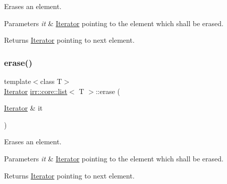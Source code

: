 Erases an element. 


\begin{DoxyParams}{Parameters}
{\em it} & \hyperlink{classirr_1_1core_1_1list_1_1Iterator}{Iterator} pointing to the element which shall be erased. \\
\hline
\end{DoxyParams}
\begin{DoxyReturn}{Returns}
\hyperlink{classirr_1_1core_1_1list_1_1Iterator}{Iterator} pointing to next element. 
\end{DoxyReturn}
\mbox{\label{classirr_1_1core_1_1list_a407935fc79a35ce7caa19e4f6ce25c3f}} 
\subsubsection{\texorpdfstring{erase()}{erase()}\hspace{0.1cm}{\footnotesize\ttfamily [2/2]}}
{\footnotesize\ttfamily template$<$class T$>$ \\
\hyperlink{classirr_1_1core_1_1list_1_1Iterator}{Iterator} \hyperlink{classirr_1_1core_1_1list}{irr\+::core\+::list}$<$ T $>$\+::erase (\begin{DoxyParamCaption}\item[{\hyperlink{classirr_1_1core_1_1list_1_1Iterator}{Iterator} \&}]{it }\end{DoxyParamCaption})\hspace{0.3cm}{\ttfamily [inline]}}



Erases an element. 


\begin{DoxyParams}{Parameters}
{\em it} & \hyperlink{classirr_1_1core_1_1list_1_1Iterator}{Iterator} pointing to the element which shall be erased. \\
\hline
\end{DoxyParams}
\begin{DoxyReturn}{Returns}
\hyperlink{classirr_1_1core_1_1list_1_1Iterator}{Iterator} pointing to next element. 
\end{DoxyReturn}
\mbox{\label{classirr_1_1core_1_1list_a6ba09d4c7865a451e40b5bd5f4c2dd50}} 
